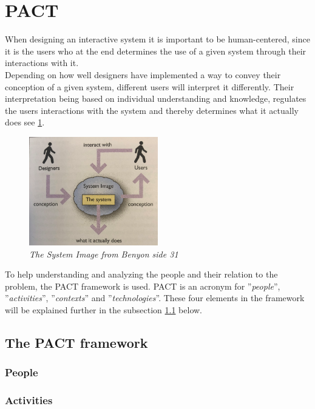 \section{PACT}\label{sec:PACT}
When designing an interactive system it is important to be human-centered, since it is the users who at the end determines the use of a given system through their interactions with it.
\\\indent
Depending on how well designers have implemented a way to convey their conception of a given system, different users will interpret it differently. 
Their interpretation being based on individual understanding and knowledge, regulates the users interactions with the system and thereby determines what it actually does see \cref{fig:PACT-SystemImage}.

\begin{figure}[H]
	\centering
	\includegraphics[width=0.5\textwidth]{billeder/SystemImage-Benyon.png}
	\caption{\textit{The System Image from {\color{red}Benyon side 31}}}
	\label{fig:PACT-SystemImage}
\end{figure}


To help understanding and analyzing the people and their relation to the problem, the PACT framework is used.
PACT is an acronym for ''{\itshape{people}}'', ''{\itshape{activities}}'', ''{\itshape{contexts}}'' and ''{\itshape{technologies}}''.
These four elements in the framework will be explained further in the subsection \ref{sec:PACT-framework} below.

\subsection{The PACT framework}\label{sec:PACT-framework}
\subsubsection*{People}

\subsubsection*{Activities}

